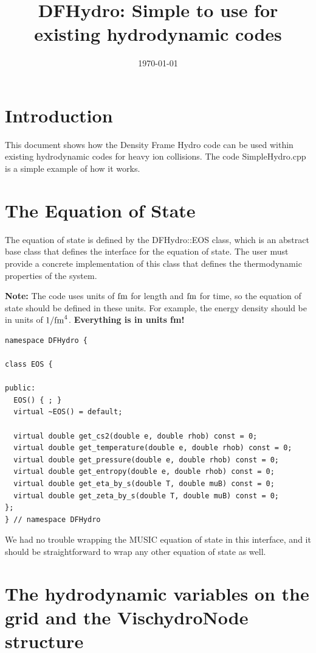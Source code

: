 \documentclass[12pt]{article}
\title{DFHydro: Simple to use for existing hydrodynamic codes}
\date{\today}
\begin{document}
\maketitle      %
\tableofcontents %

\section{Introduction}
This document shows how the Density Frame Hydro code can be used within existing hydrodynamic codes for heavy ion collisions.  The code SimpleHydro.cpp is a simple example of how it works.

\section{The Equation of State}
The  equation of state is defined by the DFHydro::EOS class, which is an abstract base class that defines the interface for the equation of state.  The user must provide a concrete implementation of this class that defines the thermodynamic properties of the system.  

{\bf Note:} The code uses units of ${\rm fm}$ for length and ${\rm fm}$ for time,
so the equation of state should be defined in these units.  For example, the
energy density should be in units of ${1/{\rm fm}^4}$. {\bf Everything  is in units  fm!} 

\begin{verbatim}
namespace DFHydro {

class EOS {

public:
  EOS() { ; }
  virtual ~EOS() = default;

  virtual double get_cs2(double e, double rhob) const = 0;
  virtual double get_temperature(double e, double rhob) const = 0;
  virtual double get_pressure(double e, double rhob) const = 0;
  virtual double get_entropy(double e, double rhob) const = 0;
  virtual double get_eta_by_s(double T, double muB) const = 0;
  virtual double get_zeta_by_s(double T, double muB) const = 0;
};
} // namespace DFHydro
\end{verbatim}
We had no trouble wrapping the MUSIC equation of state in this interface, and it should be straightforward to wrap any other equation of state as well. 

\section{The hydrodynamic variables on the grid and the VischydroNode structure}
\end{document}
